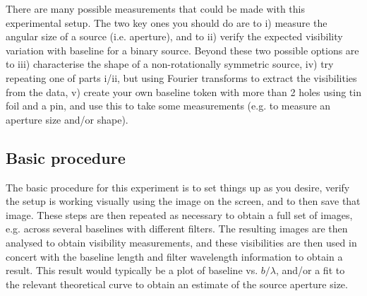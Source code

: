 \documentclass[11pt]{article}
\begin{document}
There are many possible measurements that could be made with this experimental setup. The two key ones you should do are to i) measure the angular size of a source (i.e. aperture), and to ii) verify the expected visibility variation with baseline for a binary source. Beyond these two possible options are to iii) characterise the shape of a non-rotationally symmetric source, iv) try repeating one of parts i/ii, but using Fourier transforms to extract the visibilities from the data, v) create your own baseline token with more than 2 holes using tin foil and a pin, and use this to take some measurements (e.g. to measure an aperture size and/or shape).

\subsection{Basic procedure}

The basic procedure for this experiment is to set things up as you desire, verify the setup is working visually using the image on the screen, and to then save that image. These steps are then repeated as necessary to obtain a full set of images, e.g. across several baselines with different filters. The resulting images are then analysed to obtain visibility measurements, and these visibilities are then used in concert with the baseline length and filter wavelength information to obtain a result. This result would typically be a plot of baseline vs. $b/\lambda$, and/or a fit to the relevant theoretical curve to obtain an estimate of the source aperture size.



\end{document}
